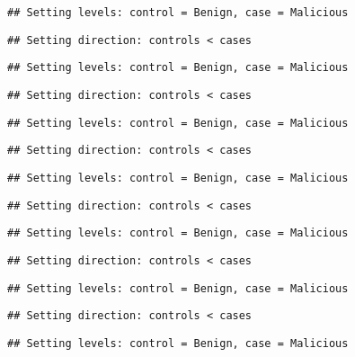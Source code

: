 \documentclass[
]{article}
\begin{document}
\begin{verbatim}
## Setting levels: control = Benign, case = Malicious
\end{verbatim}

\begin{verbatim}
## Setting direction: controls < cases
\end{verbatim}

\begin{verbatim}
## Setting levels: control = Benign, case = Malicious
\end{verbatim}

\begin{verbatim}
## Setting direction: controls < cases
\end{verbatim}

\begin{verbatim}
## Setting levels: control = Benign, case = Malicious
\end{verbatim}

\begin{verbatim}
## Setting direction: controls < cases
\end{verbatim}

\begin{verbatim}
## Setting levels: control = Benign, case = Malicious
\end{verbatim}

\begin{verbatim}
## Setting direction: controls < cases
\end{verbatim}

\begin{verbatim}
## Setting levels: control = Benign, case = Malicious
\end{verbatim}

\begin{verbatim}
## Setting direction: controls < cases
\end{verbatim}

\begin{verbatim}
## Setting levels: control = Benign, case = Malicious
\end{verbatim}

\begin{verbatim}
## Setting direction: controls < cases
\end{verbatim}

\begin{verbatim}
## Setting levels: control = Benign, case = Malicious
\end{verbatim}
\end{document}
